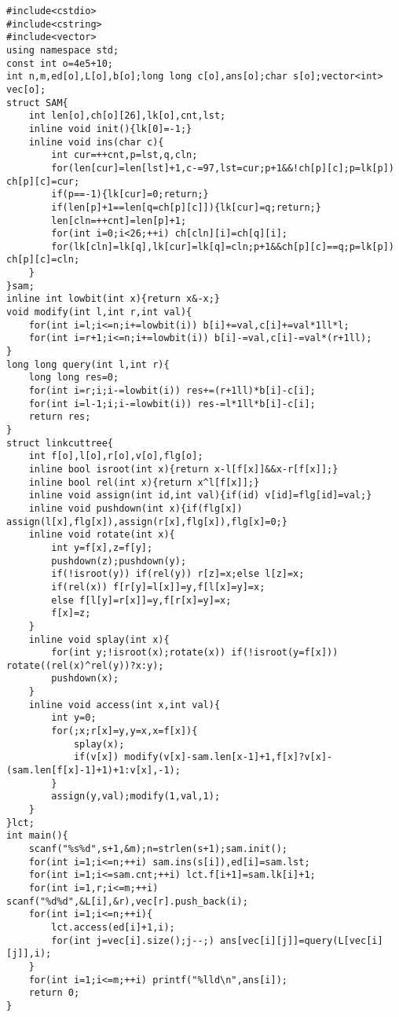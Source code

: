 \begin{verbatim}
#include<cstdio>
#include<cstring>
#include<vector>
using namespace std;
const int o=4e5+10;
int n,m,ed[o],L[o],b[o];long long c[o],ans[o];char s[o];vector<int> vec[o];
struct SAM{
	int len[o],ch[o][26],lk[o],cnt,lst;
	inline void init(){lk[0]=-1;}
	inline void ins(char c){
		int cur=++cnt,p=lst,q,cln;
		for(len[cur]=len[lst]+1,c-=97,lst=cur;p+1&&!ch[p][c];p=lk[p]) ch[p][c]=cur;
		if(p==-1){lk[cur]=0;return;}
		if(len[p]+1==len[q=ch[p][c]]){lk[cur]=q;return;}
		len[cln=++cnt]=len[p]+1;
		for(int i=0;i<26;++i) ch[cln][i]=ch[q][i];
		for(lk[cln]=lk[q],lk[cur]=lk[q]=cln;p+1&&ch[p][c]==q;p=lk[p]) ch[p][c]=cln;
	}
}sam;
inline int lowbit(int x){return x&-x;}
void modify(int l,int r,int val){
	for(int i=l;i<=n;i+=lowbit(i)) b[i]+=val,c[i]+=val*1ll*l;
	for(int i=r+1;i<=n;i+=lowbit(i)) b[i]-=val,c[i]-=val*(r+1ll);
}
long long query(int l,int r){
	long long res=0;
	for(int i=r;i;i-=lowbit(i)) res+=(r+1ll)*b[i]-c[i];
	for(int i=l-1;i;i-=lowbit(i)) res-=l*1ll*b[i]-c[i];
	return res;
}
struct linkcuttree{
	int f[o],l[o],r[o],v[o],flg[o];
	inline bool isroot(int x){return x-l[f[x]]&&x-r[f[x]];}
	inline bool rel(int x){return x^l[f[x]];}
	inline void assign(int id,int val){if(id) v[id]=flg[id]=val;}
	inline void pushdown(int x){if(flg[x]) assign(l[x],flg[x]),assign(r[x],flg[x]),flg[x]=0;}
	inline void rotate(int x){
		int y=f[x],z=f[y];
		pushdown(z);pushdown(y);
		if(!isroot(y)) if(rel(y)) r[z]=x;else l[z]=x;
		if(rel(x)) f[r[y]=l[x]]=y,f[l[x]=y]=x;
		else f[l[y]=r[x]]=y,f[r[x]=y]=x;
		f[x]=z;
	}
	inline void splay(int x){
		for(int y;!isroot(x);rotate(x)) if(!isroot(y=f[x])) rotate((rel(x)^rel(y))?x:y);
		pushdown(x);
	}
	inline void access(int x,int val){
		int y=0;
		for(;x;r[x]=y,y=x,x=f[x]){
			splay(x);
			if(v[x]) modify(v[x]-sam.len[x-1]+1,f[x]?v[x]-(sam.len[f[x]-1]+1)+1:v[x],-1);
		}
		assign(y,val);modify(1,val,1);
	}
}lct;
int main(){
	scanf("%s%d",s+1,&m);n=strlen(s+1);sam.init();
	for(int i=1;i<=n;++i) sam.ins(s[i]),ed[i]=sam.lst;
	for(int i=1;i<=sam.cnt;++i) lct.f[i+1]=sam.lk[i]+1;
	for(int i=1,r;i<=m;++i) scanf("%d%d",&L[i],&r),vec[r].push_back(i);
	for(int i=1;i<=n;++i){
		lct.access(ed[i]+1,i);
		for(int j=vec[i].size();j--;) ans[vec[i][j]]=query(L[vec[i][j]],i);
	}
	for(int i=1;i<=m;++i) printf("%lld\n",ans[i]);
	return 0;
}
\end{verbatim}
